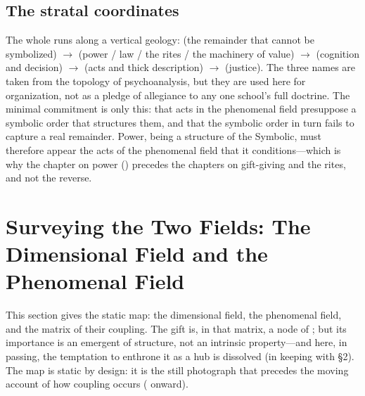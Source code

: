 \subsection{The stratal coordinates}
The whole runs along a vertical geology:  (the remainder that cannot be symbolized) $\rightarrow$  (power / law / the rites / the machinery of value) $\rightarrow$  (cognition and decision) $\rightarrow$  (acts and thick description) $\rightarrow$  (justice). The three names are taken from the topology of psychoanalysis, but they are used here for organization, not as a pledge of allegiance to any one school's full doctrine. The minimal commitment is only this: that acts in the phenomenal field presuppose a symbolic order that structures them, and that the symbolic order in turn fails to capture a real remainder. Power, being a structure of the Symbolic, must therefore appear  the acts of the phenomenal field that it conditions---which is why the chapter on power () precedes the chapters on gift-giving and the rites, and not the reverse.

\section{Surveying the Two Fields: The Dimensional Field and the Phenomenal Field}

This section gives the static map: the dimensional field, the phenomenal field, and the matrix of their coupling. The gift is, in that matrix, a node of ; but its importance is an emergent of structure, not an intrinsic property---and here, in passing, the temptation to enthrone it as a hub is dissolved (in keeping with \S2). The map is static by design: it is the still photograph that precedes the moving account of how coupling occurs ( onward).

